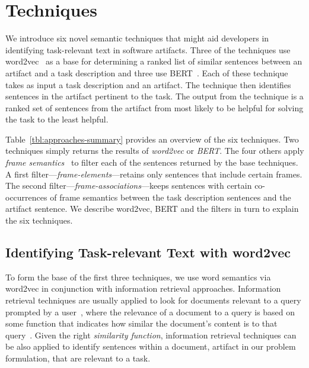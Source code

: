 \clearpage

\section{Techniques}
\label{cp5:approaches}



We introduce six novel semantic techniques that might 
aid developers in identifying
task-relevant text in software artifacts. Three of the
techniques use word2vec~\cite{Mikolov2013} as a base for determining a ranked list of similar sentences between an artifact
and a task description and three use BERT~\cite{Devlin2018Bert}.
Each of these technique takes as input
a task description and an artifact. The technique then identifies
sentences in the artifact pertinent to the task. The output
from the technique is a ranked set of sentences from
the artifact from most likely to be helpful for solving the
task to the least helpful.



Table~\ref{tbl:approaches-summary} provides an overview of the six techniques.
Two techniques simply returns the results of \textit{word2vec} or \textit{BERT}.
The four others apply \textit{frame semantics}~\cite{fillmore1976frame} to filter
 each of the sentences returned by the base techniques.
A first filter---\textit{frame-elements}---retains only sentences
that include certain frames. The second filter---\textit{frame-associations}---keeps
sentences with certain co-occurrences of 
frame semantics between the task description sentences
and the artifact sentence. We describe word2vec, BERT and the filters in turn to
explain the six techniques.






\subsection{Identifying Task-relevant Text with word2vec}
\label{cp5:approach-w2v}



To form the base of the first three techniques,  we use word semantics via word2vec in conjunction with information retrieval approaches.
Information retrieval techniques are usually applied to look for documents relevant to a query prompted by a user~\cite{Bavota2016}, where the relevance of a document to a query is based on some function that indicates how similar the document's content is to that query~\cite{Manning2009IR}. Given the right \textit{similarity function}, information retrieval  techniques 
can be also applied to identify sentences within a document, artifact in our problem formulation, that are relevant to a task.


